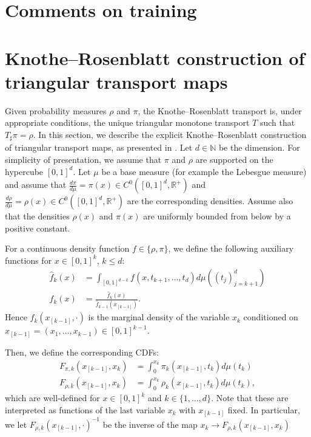 \appendix








\section{Comments on training}\label{app:training}





\section{Knothe--Rosenblatt construction of triangular transport maps}\label{app:KRMap}	
Given probability measures $\rho$ and $\pi$, the Knothe--Rosenblatt transport is, under appropriate conditions, the unique triangular monotone transport $T$ such that $T_\sharp\pi = \rho$. In this section, we describe the explicit Knothe--Rosenblatt construction of triangular transport maps, as presented in \cite{OTAppliedMathematician}. Let $d\in\mathbb{N}$ be the dimension. For simplicity of presentation, we assume that $\pi$ and $\rho$ are supported on the hypercube $[0,1]^d$. Let $\mu$ be a base measure (for example the Lebesgue measure) and assume that $\frac{d\pi}{d\mu} = \pi(x)\in C^0([0,1]^d, \mathbb{R}^+)$ and $\frac{d\rho}{d\mu} = \rho(x)\in C^0([0,1]^d, \mathbb{R}^+)$ are the corresponding densities. Assume also that the densities $\rho(x)$ and $\pi(x)$ are uniformly bounded from below by a positive constant. 

For a continuous density function $f \in \{\rho, \pi\}$, we define the following auxiliary functions for $x\in[0,1]^k$, $k\leq d$:
\begin{equation}
\begin{aligned}
\hat{f}_k(x) &= \int_{[0,1]^{d-k}}f(x, t_{k+1},\dots ,t_d)d\mu((t_j)_{j=k+1}^d)\\
f_k(x) &= \frac{\hat{f}_k(x)}{\hat{f}_{k-1}(x_{[k-1]})}.
\end{aligned}
\end{equation}
Hence $f_k(x_{[k-1]}, \cdot)$ is the marginal density of the variable $x_k$ conditioned on $x_{[k-1]} = (x_1,\dots ,x_{k-1})\in[0,1]^{k-1}$.

Then, we define the corresponding CDFs:
\begin{equation}\label{eq:Fpik}
\begin{aligned}
F_{\pi,k}(x_{[k-1]}, x_k) &= \int_{0}^{x_k}\pi_k(x_{[k-1]}, t_{k})d\mu(t_k)\\
F_{\rho,k}(x_{[k-1]}, x_k) &= \int_{0}^{x_k}\rho_k(x_{[k-1]}, t_{k})d\mu(t_k),
\end{aligned}
\end{equation}
which are well-defined for $x\in[0,1]^k$ and $k\in\{1,\dots ,d\}$. Note that these are interpreted as functions of the last variable $x_k$ with $x_{[k-1]}$ fixed. In particular, we let $F_{\rho,k}(x_{[k-1]}, \cdot)^{-1}$ be the inverse of the map $x_k\rightarrow F_{\rho,k}(x_{[k-1]}, x_k)$

